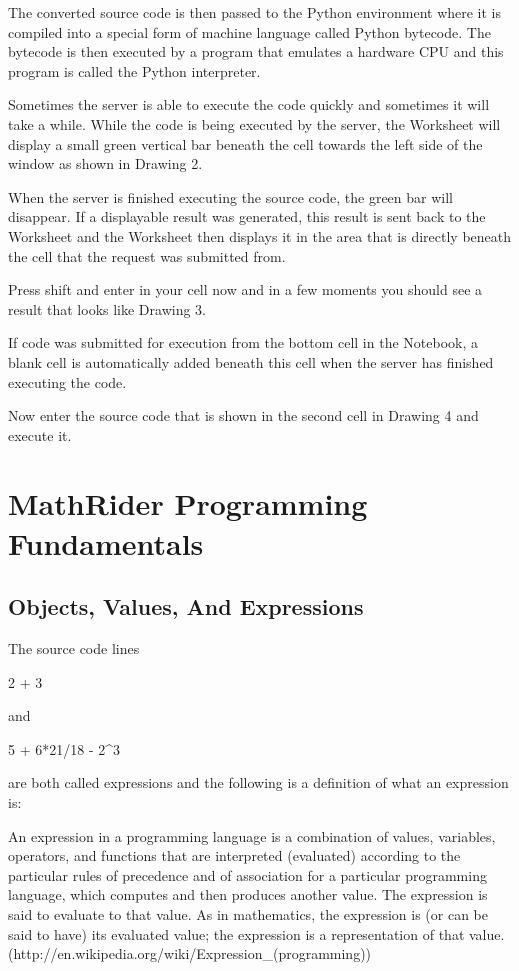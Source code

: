 \documentclass[12pt,oneside]{book}
\begin{document}
The converted source code is then passed to the Python environment where it is compiled into a special form of machine language called Python bytecode. The bytecode is then executed by a program that emulates a hardware CPU and this program is called the Python interpreter.  

Sometimes the server is able to execute the code quickly and sometimes it will take a while. While the code is being executed by the server, the Worksheet will display a small green vertical bar beneath the cell towards the left side of the window as shown in Drawing 2. 


When the server is finished executing the source code, the green bar will disappear. If a displayable result was generated, this result is sent back to the Worksheet and the Worksheet then displays it in the area that is directly beneath the cell that the request was submitted from. 

Press shift and enter in your cell now and in a few moments you should see a result that looks like Drawing 3. 

If code was submitted for execution from the bottom cell in the Notebook, a blank cell is automatically added beneath this cell when the server has finished executing the code. 

Now enter the source code that is shown in the second cell in Drawing 4 and execute it.  


\chapter[MathRider Programming Fundamentals]{MathRider Programming Fundamentals}

\section[Objects, Values, And Expressions]{Objects, Values, And Expressions}

The source code lines


2 + 3 


and 


5 + 6*21/18 {}- 2\^{}3


are both called expressions and the following is a definition of what an expression is: 

An expression in a programming language is a combination of values, variables, operators, and functions that are interpreted (evaluated) according to the particular rules of precedence and of association for a particular programming language, which computes and then produces another value. The expression is said to evaluate to that value. As in mathematics, the expression is (or can be said to have) its evaluated value; the expression is a representation of that value. (http://en.wikipedia.org/wiki/Expression\_(programming)) 
\end{document}

